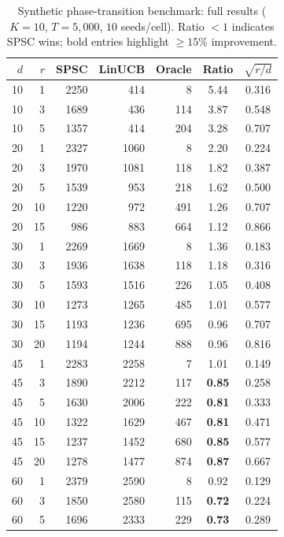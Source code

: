\documentclass{article}
\begin{document}
{\begin{table}[!htpb]
\centering
\caption{Synthetic phase-transition benchmark: full results
($K{=}10$, $T{=}5{,}000$, $10$ seeds/cell).
Ratio $< 1$ indicates SPSC wins; bold entries highlight
$\ge 15\%$ improvement.}
\label{tab:synthetic-phase}
\small
\setlength{\tabcolsep}{4pt}
\begin{tabular}{rr|rrr|cc}
\toprule
$d$ & $r$ & SPSC & LinUCB & Oracle & Ratio & $\sqrt{r/d}$ \\
\midrule
10 &  1 & 2250 &  414 &    8 & 5.44 & 0.316 \\
10 &  3 & 1689 &  436 &  114 & 3.87 & 0.548 \\
10 &  5 & 1357 &  414 &  204 & 3.28 & 0.707 \\
\midrule
20 &  1 & 2327 & 1060 &    8 & 2.20 & 0.224 \\
20 &  3 & 1970 & 1081 &  118 & 1.82 & 0.387 \\
20 &  5 & 1539 &  953 &  218 & 1.62 & 0.500 \\
20 & 10 & 1220 &  972 &  491 & 1.26 & 0.707 \\
20 & 15 &  986 &  883 &  664 & 1.12 & 0.866 \\
\midrule
30 &  1 & 2269 & 1669 &    8 & 1.36 & 0.183 \\
30 &  3 & 1936 & 1638 &  118 & 1.18 & 0.316 \\
30 &  5 & 1593 & 1516 &  226 & 1.05 & 0.408 \\
30 & 10 & 1273 & 1265 &  485 & 1.01 & 0.577 \\
30 & 15 & 1193 & 1236 &  695 & 0.96 & 0.707 \\
30 & 20 & 1194 & 1244 &  888 & 0.96 & 0.816 \\
\midrule
45 &  1 & 2283 & 2258 &    7 & 1.01 & 0.149 \\
45 &  3 & 1890 & 2212 &  117 & \textbf{0.85} & 0.258 \\
45 &  5 & 1630 & 2006 &  222 & \textbf{0.81} & 0.333 \\
45 & 10 & 1322 & 1629 &  467 & \textbf{0.81} & 0.471 \\
45 & 15 & 1237 & 1452 &  680 & \textbf{0.85} & 0.577 \\
45 & 20 & 1278 & 1477 &  874 & \textbf{0.87} & 0.667 \\
\midrule
60 &  1 & 2379 & 2590 &    8 & 0.92 & 0.129 \\
60 &  3 & 1850 & 2580 &  115 & \textbf{0.72} & 0.224 \\
60 &  5 & 1696 & 2333 &  229 & \textbf{0.73} & 0.289 \\

\end{tabular}
\end{table}}
\end{document}
